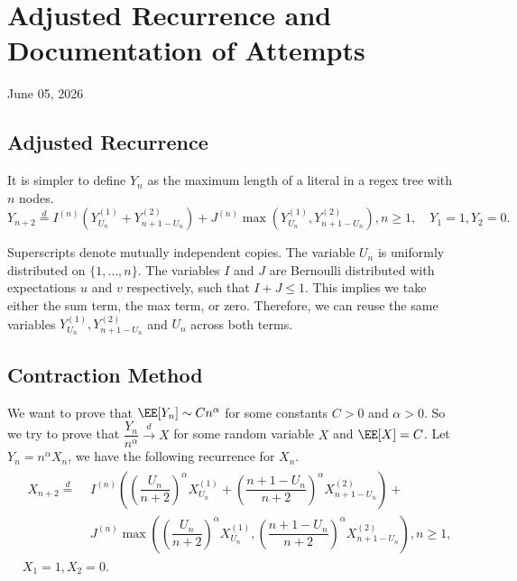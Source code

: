 \chapter[Adjusted Recurrence and Documentation of Attempts]{Adjusted Recurrence and \\ Documentation of Attempts}

\begin{center}
  June 05, 2026
  \vspace{0.5cm}
\end{center}

\section{Adjusted Recurrence}

It is simpler to define $Y_n$ as the maximum length of a literal in a regex tree with $n$ nodes.
\begin{equation}
  Y_{n+2} \stackrel{d}{=} I^{(n)}\left(Y_{U_n}^{(1)} + Y_{n+1-U_n}^{(2)}\right) + J^{(n)}\max\left(Y_{U_n}^{(1)}, Y_{n+1-U_n}^{(2)}\right), n\ge 1, \quad Y_1=1, Y_2=0.
\end{equation}

Superscripts denote mutually independent copies. The variable $U_n$ is uniformly distributed on $\{1, \ldots, n\}$. The variables $I$ and $J$ are Bernoulli distributed with expectations $u$ and $v$ respectively, such that $I + J \le 1$. This implies we take either the sum term, the max term, or zero. Therefore, we can reuse the same variables $Y_{U_n}^{(1)}, Y_{n+1-U_n}^{(2)}$ and $U_n$ across both terms.



\section{Contraction Method}
We want to prove that $\EE[Y_n]\sim Cn^\alpha$ for some constants $C>0$ and $\alpha>0$. So we try to prove that $\dfrac{Y_n}{n^\alpha}\xrightarrow{d} X$ for some random variable $X$ and $\EE[X]=C$. Let $Y_n = n^\alpha X_n$, we have the following recurrence for $X_n$.
\begin{equation}
  \begin{aligned}
     & \begin{aligned}
         X_{n+2}
         \stackrel{d}{=}\,\, & I^{(n)}\left(\left(\dfrac{U_n}{n+2}\right)^\alpha X_{U_n}^{(1)} + \left(\dfrac{n+1-U_n}{n+2}\right)^\alpha X_{n+1-U_n}^{(2)}\right) +           \\
                             & J^{(n)}\max\left(\left(\dfrac{U_n}{n+2}\right)^\alpha X_{U_n}^{(1)}, \left(\dfrac{n+1-U_n}{n+2}\right)^\alpha X_{n+1-U_n}^{(2)}\right), n\ge 1,
       \end{aligned} \\
     & X_1=1, X_2=0.
  \end{aligned}
\end{equation}

